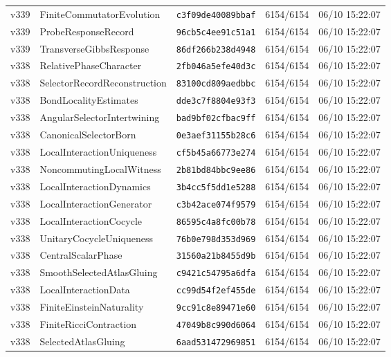 \documentclass[11pt]{article}
\theoremstyle{definition}\newtheorem{deriv}{Derivation}
\begin{document}
{\begin{longtable}{@{}lllll@{}}
v339 & FiniteCommutatorEvolution & \texttt{c3f09de40089bbaf} & 6154/6154 & 06/10 15:22:07 \\
v339 & ProbeResponseRecord & \texttt{96cb5c4ee91c51a1} & 6154/6154 & 06/10 15:22:07 \\
v339 & TransverseGibbsResponse & \texttt{86df266b238d4948} & 6154/6154 & 06/10 15:22:07 \\
v338 & RelativePhaseCharacter & \texttt{2fb046a5efe40d3c} & 6154/6154 & 06/10 15:22:07 \\
v338 & SelectorRecordReconstruction & \texttt{83100cd809aedbbc} & 6154/6154 & 06/10 15:22:07 \\
v338 & BondLocalityEstimates & \texttt{dde3c7f8804e93f3} & 6154/6154 & 06/10 15:22:07 \\
v338 & AngularSelectorIntertwining & \texttt{bad9bf02cfbac9ff} & 6154/6154 & 06/10 15:22:07 \\
v338 & CanonicalSelectorBorn & \texttt{0e3aef31155b28c6} & 6154/6154 & 06/10 15:22:07 \\
v338 & LocalInteractionUniqueness & \texttt{cf5b45a66773e274} & 6154/6154 & 06/10 15:22:07 \\
v338 & NoncommutingLocalWitness & \texttt{2b81bd84bbc9ee86} & 6154/6154 & 06/10 15:22:07 \\
v338 & LocalInteractionDynamics & \texttt{3b4cc5f5dd1e5288} & 6154/6154 & 06/10 15:22:07 \\
v338 & LocalInteractionGenerator & \texttt{c3b42ace074f9579} & 6154/6154 & 06/10 15:22:07 \\
v338 & LocalInteractionCocycle & \texttt{86595c4a8fc00b78} & 6154/6154 & 06/10 15:22:07 \\
v338 & UnitaryCocycleUniqueness & \texttt{76b0e798d353d969} & 6154/6154 & 06/10 15:22:07 \\
v338 & CentralScalarPhase & \texttt{31560a21b8455d9b} & 6154/6154 & 06/10 15:22:07 \\
v338 & SmoothSelectedAtlasGluing & \texttt{c9421c54795a6dfa} & 6154/6154 & 06/10 15:22:07 \\
v338 & LocalInteractionData & \texttt{cc99d54f2ef455de} & 6154/6154 & 06/10 15:22:07 \\
v338 & FiniteEinsteinNaturality & \texttt{9cc91c8e89471e60} & 6154/6154 & 06/10 15:22:07 \\
v338 & FiniteRicciContraction & \texttt{47049b8c990d6064} & 6154/6154 & 06/10 15:22:07 \\
v338 & SelectedAtlasGluing & \texttt{6aad531472969851} & 6154/6154 & 06/10 15:22:07 \\

\end{longtable}}
\end{document}
